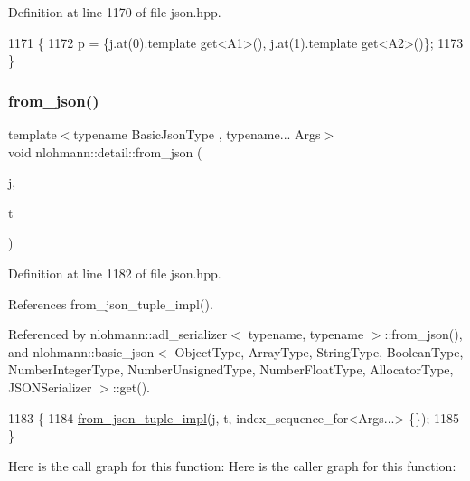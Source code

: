 Definition at line 1170 of file json.\+hpp.


\begin{DoxyCode}
1171 \{
1172     p = \{j.at(0).template get<A1>(), j.at(1).template get<A2>()\};
1173 \}
\end{DoxyCode}
\mbox{\label{namespacenlohmann_1_1detail_a8b99ec9b29f3f20a18fc4281fb784e49}} 
\subsubsection{\texorpdfstring{from\+\_\+json()}{from\_json()}\hspace{0.1cm}{\footnotesize\ttfamily [14/14]}}
{\footnotesize\ttfamily template$<$typename Basic\+Json\+Type , typename... Args$>$ \\
void nlohmann\+::detail\+::from\+\_\+json (\begin{DoxyParamCaption}\item[{const Basic\+Json\+Type \&}]{j,  }\item[{std\+::tuple$<$ Args... $>$ \&}]{t }\end{DoxyParamCaption})}



Definition at line 1182 of file json.\+hpp.



References from\+\_\+json\+\_\+tuple\+\_\+impl().



Referenced by nlohmann\+::adl\+\_\+serializer$<$ typename, typename $>$\+::from\+\_\+json(), and nlohmann\+::basic\+\_\+json$<$ Object\+Type, Array\+Type, String\+Type, Boolean\+Type, Number\+Integer\+Type, Number\+Unsigned\+Type, Number\+Float\+Type, Allocator\+Type, J\+S\+O\+N\+Serializer $>$\+::get().


\begin{DoxyCode}
1183 \{
1184     \hyperlink{namespacenlohmann_1_1detail_a28253915d9db4a0112d60eaee0422949}{from\_json\_tuple\_impl}(j, t, index\_sequence\_for<Args...> \{\});
1185 \}
\end{DoxyCode}
Here is the call graph for this function\+:
Here is the caller graph for this function\+:
\mbox{\label{namespacenlohmann_1_1detail_ac53673a5ce29fb69b96d41dad33cb3b0}} 
